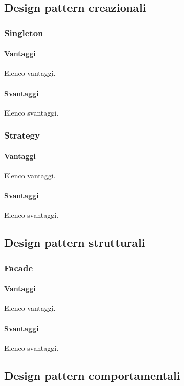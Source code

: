 \documentclass[../SpecificaTecnica.tex]{subfiles}
\begin{document}
	\subsection{Design pattern creazionali}
		\subsubsection{Singleton}
		
			\paragraph{Vantaggi}
				Elenco vantaggi.
			\paragraph{Svantaggi}
				Elenco svantaggi.
		\subsubsection{Strategy}
		
			\paragraph{Vantaggi}
				Elenco vantaggi.
			\paragraph{Svantaggi}
				Elenco svantaggi.
	\subsection{Design pattern strutturali}
		\subsubsection{Facade}
		
			\paragraph{Vantaggi}
				Elenco vantaggi.
			\paragraph{Svantaggi}
				Elenco svantaggi.
	\subsection{Design pattern comportamentali}
\end{document}
